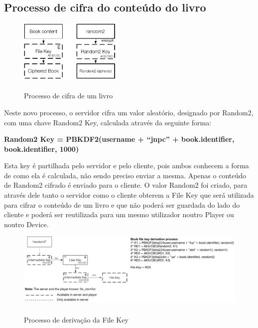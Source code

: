 \documentclass[pdftex,12pt,a4paper]{report}
\begin{document}
\subsection{Processo de cifra do conteúdo do livro}

\begin{figure}[!htb]
\center
 \includegraphics[width=50mm,scale=1]{book-cipher-process.pdf}
 \caption{\\Processo de cifra de um livro}\label{fig:eer}
\end{figure}

Neste novo processo, o servidor cifra um valor aleatório, designado por Random2, com uma chave Random2 Key, calculada através da seguinte forma:

\begin{center}
	\textbf{Random2 Key = PBKDF2(username + “jnpc” + book.identifier, book.identifier, 1000)}
\end{center}

	Esta key é partilhada pelo servidor e pelo cliente, pois ambos conhecem a forma de como ela é calculada, não sendo preciso enviar a mesma. Apenas o conteúdo de Random2 cifrado é enviado para o cliente. 
	O valor Random2 foi criado, para através dele tanto o servidor como o cliente obterem a File Key que será utilizada para cifrar o conteúdo de um livro e que não poderá ser guardada do lado do cliente e poderá ser reutilizada para um mesmo utilizador noutro Player ou noutro Device.

\begin{figure}[!htb]
\center
 \includegraphics[width=150mm,scale=1]{file-key-generation.pdf}
 \caption{\\Processo de derivação da File Key}\label{fig:eer}
\end{figure}
\end{document}
